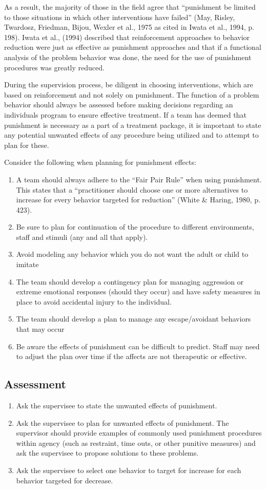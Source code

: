 As a result, the majority of those in the field agree that ``punishment be limited to those situations in which other interventions have failed'' (May, Risley, Twardosz, Friedman, Bijou, Wexler et al., 1975 as cited in Iwata et al., 1994, p. 198).  Iwata et al., (1994) described that reinforcement approaches to behavior reduction were just as effective as punishment approaches and that if a functional analysis of the problem behavior was done, the need for the use of punishment procedures was greatly reduced.  

During the supervision process, be diligent in choosing interventions, which are based on reinforcement and not solely on punishment.  The function of a problem behavior should always be assessed before making decisions regarding an individuals program to ensure effective treatment.  If a team has deemed that punishment is necessary as a part of a treatment package, it is important to state any potential unwanted effects of any procedure being utilized and to attempt to plan for these.

Consider the following when planning for punishment effects:
\begin{enumerate}
\item A team should always adhere to the ``Fair Pair Rule'' when using punishment.  This states that a ``practitioner should choose one or more alternatives to increase for every behavior targeted for reduction'' (White \& Haring, 1980, p. 423).
\item Be sure to plan for continuation of the procedure to different environments, staff and stimuli (any and all that apply).
\item Avoid modeling any behavior which you do not want the adult or child to imitate
\item The team should develop a contingency plan for managing aggression or extreme emotional responses (should they occur) and have safety measures in place to avoid accidental injury to the individual.
\item The team should develop a plan to manage any escape/avoidant behaviors that may occur 
\item Be aware the effects of punishment can be difficult to predict.  Staff may need to adjust the plan over time if the affects are not therapeutic or effective.  
\end{enumerate}
%
\subsection{Assessment}
\begin{enumerate}
\item Ask the supervisee to state the unwanted effects of punishment.
\item Ask the supervisee to plan for unwanted effects of punishment.  The supervisor should provide examples of commonly used punishment procedures within agency (such as restraint, time outs, or other punitive measures) and ask the supervisee to propose solutions to these problems. 
\item Ask the supervisee to select one behavior to target for increase for each behavior targeted for decrease. 
\end{enumerate}
%
